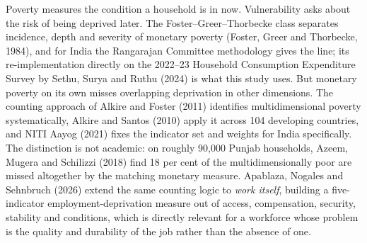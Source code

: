 \documentclass[11pt]{article}
\begin{document}
Poverty measures the condition a household is in now. Vulnerability asks about the risk of
being deprived later. The Foster--Greer--Thorbecke class separates incidence, depth and
severity of monetary poverty (Foster, Greer and Thorbecke, 1984), and for India the
Rangarajan Committee methodology gives the line; its re-implementation directly on the
2022--23 Household Consumption Expenditure Survey by Sethu, Surya and Ruthu (2024) is what
this study uses. But monetary poverty on its own misses overlapping deprivation in other
dimensions. The counting approach of Alkire and Foster (2011) identifies multidimensional
poverty systematically, Alkire and Santos (2010) apply it across 104 developing countries,
and NITI Aayog (2021) fixes the indicator set and weights for India specifically. The
distinction is not academic: on roughly 90,000 Punjab households, Azeem, Mugera and Schilizzi
(2018) find 18 per cent of the multidimensionally poor are missed altogether by the matching
monetary measure. Apablaza, Nogales and Sehnbruch (2026) extend the same counting logic to
\emph{work itself}, building a five-indicator employment-deprivation measure out of access,
compensation, security, stability and conditions, which is directly relevant for a workforce
whose problem is the quality and durability of the job rather than the absence of one.
\end{document}
